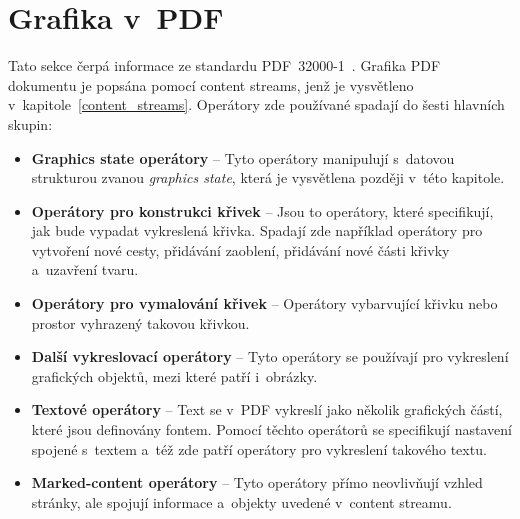\section{Grafika v~PDF}
Tato sekce čerpá informace ze standardu PDF~32000-1~\cite[k.~8, s.~110--236]{PDF32000-1:2008}.
Grafika PDF dokumentu je popsána pomocí content streams, jenž je vysvětleno
v~kapitole~\ref{content_streams}. Operátory zde používané spadají do šesti
hlavních skupin:
\begin{itemize}
    \item \textbf{Graphics state operátory} -- Tyto operátory manipulují
    s~datovou strukturou zvanou \emph{graphics state}, která je vysvětlena později
    v~této kapitole.
    \item \textbf{Operátory pro konstrukci křivek} -- Jsou to operátory, které
    specifikují, jak bude vypadat vykreslená křivka. Spadají zde například
    operátory pro vytvoření nové cesty, přidávání zaoblení, přidávání nové části
    křivky a~uzavření tvaru.
    \item \textbf{Operátory pro vymalování křivek} -- Operátory vybarvující
    křivku nebo prostor vyhrazený takovou křivkou.
    \item \textbf{Další vykreslovací operátory} -- Tyto operátory se používají
    pro vykreslení grafických objektů, mezi které patří i~obrázky.
    \item \textbf{Textové operátory} -- Text se v~PDF vykreslí jako několik
    grafických částí, které jsou definovány fontem. Pomocí těchto operátorů
    se specifikují nastavení spojené s~textem a~též zde patří operátory pro
    vykreslení takového textu. 
    \item \textbf{Marked-content operátory} -- Tyto operátory přímo neovlivňují
    vzhled stránky, ale spojují informace a~objekty uvedené v~content streamu.
\end{itemize}


